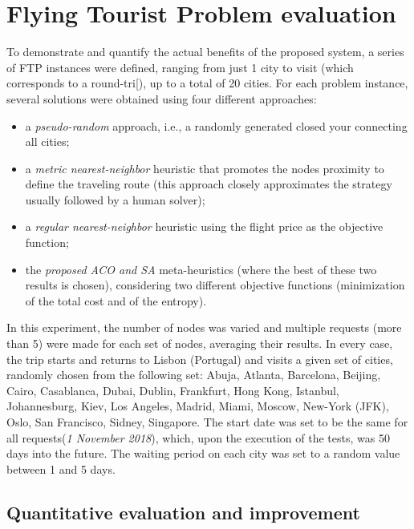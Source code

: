 \section{Flying Tourist Problem evaluation}
\label{sec:ftp_eval}

To demonstrate and quantify the actual benefits of the proposed system, a series of FTP instances were defined, ranging from just 1 city to visit (which corresponds to a round-tri[), up to a total of 20 cities. For each problem instance, several solutions were obtained using four different approaches:
\begin{itemize}
    \item a \textit{pseudo-random} approach, i.e., a randomly generated closed your connecting all cities;
    \item a \textit{metric nearest-neighbor} heuristic that promotes the nodes proximity to define the traveling route (this approach closely approximates the strategy usually followed by a human solver);
    \item a \textit{regular nearest-neighbor} heuristic using the flight price as the objective function;
    \item the \textit{proposed ACO and SA} meta-heuristics (where the best of these two results is chosen), considering two different objective functions (minimization of the total cost and of the entropy). 
\end{itemize}  

In this experiment, the number of nodes was varied and multiple requests (more than 5) were made for each set of nodes, averaging their results.
In every case, the trip starts and returns to Lisbon (Portugal) and visits a given set of cities, randomly chosen from the following set: 
Abuja, Atlanta, Barcelona, Beijing, Cairo, Casablanca, Dubai, Dublin, Frankfurt, Hong Kong, Istanbul, 
Johannesburg, Kiev, Los Angeles, Madrid, Miami, Moscow, New-York (JFK), Oslo, San Francisco, Sidney, Singapore. The start date was set to be the same for all requests(\textit{1 November 2018}), which, upon the execution of the tests, was 50 days into the future. The waiting period on each city was set to a random value between 1 and 5 days. 


\subsection{Quantitative evaluation and improvement}
\label{sec:ftp_quantitative_eval}

